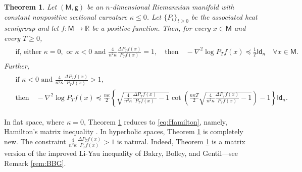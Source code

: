 \documentclass[a4paper,twoside,11pt,reqno]{amsart}
\newtheorem{theorem}{Theorem}
\newcommand{\R}{\mathbb{R}} %
\newcommand{\MM}{\mathsf{M}}
\newcommand{\GG}{\mathsf{g}}
\newcommand{\msf}{\mathsf}
\begin{document}
\begin{theorem}
\label{thm:Hamilton_intro}
 Let $(\MM,\GG)$ be an $n$-dimensional Riemannian manifold with constant nonpositive sectional curvature $\kappa \le 0$. Let $\{P_t\}_{t\ge 0}$ be the associated heat semigroup and let  $f:\MM\to \R$  be a positive function. Then, for every $x\in\MM$ and every $T\ge 0$, 
\begin{align}
\label{eq:Hamilton_matrix_inq_negcurved_lambda=0_intro}
\begin{split}
&\text{if, either }\kappa=0, \text{ or }\kappa<0\text{ and }\frac{4}{n^2\kappa}\frac{\Delta P_Tf(x)}{P_Tf(x)}=1,\quad\text{then}\quad -\nabla^2\log P_Tf(x)	\preceq   \frac{1}{T}\msf{Id}_n\quad\forall x\in \MM.
\end{split}
\end{align}
Further,
\begin{align}
\label{eq:Hamilton_matrix_inq_negcurved_lambda>0_intro}
\begin{split}
&\text{if }\kappa<0\text{ and }\frac{4}{n^2\kappa}\frac{\Delta P_Tf(x)}{P_Tf(x)}>1,\\
&\text{then}\quad 
-\nabla^2\log P_Tf(x)	\preceq \frac{n\kappa}{2}\left\{\sqrt{\frac{4}{n^2\kappa}\frac{\Delta P_Tf(x)}{P_Tf(x)}-1}\cot\left(\frac{n\kappa T}{2}\sqrt{\frac{4}{n^2\kappa}\frac{\Delta P_Tf(x)}{P_Tf(x)}-1}\right)-1\right\}\msf{Id}_n.
\end{split}
\end{align}
\end{theorem}
In flat space, where $\kappa=0$, Theorem \ref{thm:Hamilton_intro} reduces to \eqref{eq:Hamilton}, namely, Hamilton's matrix inequality \cite[Corollary 4.4]{Ham93}. In hyperbolic spaces, Theorem \ref{thm:Hamilton_intro} is completely new. The constraint $\frac{4}{n^2\kappa}\frac{\Delta P_Tf(x)}{P_Tf(x)}>1$ is natural. Indeed, Theorem \ref{thm:Hamilton_intro} is a matrix version of the improved Li-Yau inequality of Bakry, Bolley, and Gentil---see Remark \ref{rem:BBG}.
\end{document}
